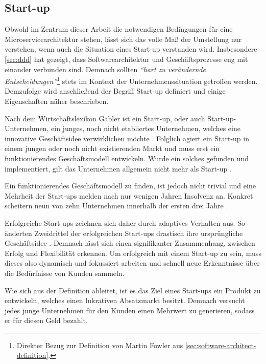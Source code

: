 \subsection{Start-up}
\label{sec:start-up}

Obwohl im Zentrum dieser Arbeit die notwendigen Bedingungen für eine Microservicearchitektur stehen, lässt sich das volle Maß der Umstellung nur verstehen, wenn auch die Situation eines Start-up verstanden wird. Insbesondere \cref{sec:ddd} hat gezeigt, dass Softwarearchitektur und Geschäftsprozesse eng mit einander verbunden sind. Demnach sollten \textit{\enquote{hart zu verändernde Entscheidungen}}\footnote{Direkter Bezug zur Definition von Martin Fowler aus \cref{sec:software-architect-definition}.} stets im Kontext der Unternehmenssituation getroffen werden. Demzufolge wird anschließend der Begriff Start-up definiert und einige Eigenschaften näher beschrieben.

Nach dem Wirtschaftslexikon Gabler ist ein Start-up, oder auch Start-up-Unternehmen, ein junges, noch nicht etabliertes Unternehmen, welches eine innovative Geschäftsidee verwirklichen möchte \parencite[vgl.][]{achleitner_start-up_2018}. Folglich agiert ein Start-up in einem jungen oder noch nicht existierenden Markt und muss erst ein funktionierendes Geschäftsmodell entwickeln. Wurde ein solches gefunden und implementiert, gilt das Unternehmen allgemein nicht mehr als Start-up \parencite[vgl.][]{wiki_start-up-unternehmen_2020}.

Ein funktionierendes Geschäftsmodell zu finden, ist jedoch nicht trivial und eine Mehrheit der Start-ups melden nach nur wenigen Jahren Insolvenz an. Konkret scheitern neun von zehn Unternehmen innerhalb der ersten drei Jahre \parencite[vgl.][]{patel_startups-fail_2015}.

Erfolgreiche Start-ups zeichnen sich daher durch adaptives Verhalten aus. So änderten Zweidrittel der erfolgreichen Start-ups drastisch ihre ursprüngliche Geschäftsidee \parencite{mullins_getting_2009}. Demnach lässt sich einen signifikanter Zusammenhang, zwischen Erfolg und Flexibilität erkennen. Um erfolgreich mit einem Start-up zu sein, muss dieses also dynamisch und fokussiert arbeiten und schnell neue Erkenntnisse über die Bedürfnisse von Kunden sammeln.

Wie sich aus der Definition ableitet, ist es das Ziel eines Start-ups ein Produkt zu entwickeln, welches einen lukrativen Absatzmarkt besitzt. Demnach versucht jedes junge Unternehmen für den Kunden einen Mehrwert zu generieren, sodass er für diesen Geld bezahlt.

